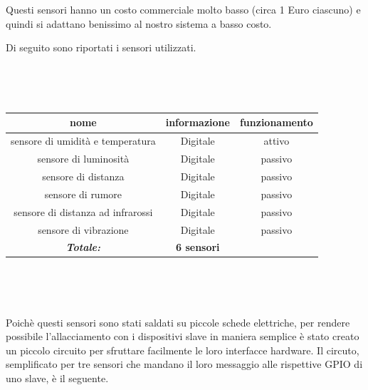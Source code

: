 \documentclass[a4paper,titlepage]{book}
\begin{document}
Questi sensori hanno un costo commerciale molto basso (circa 1 Euro ciascuno) e quindi si adattano benissimo al nostro sistema a basso costo.


Di seguito sono riportati i sensori utilizzati.

~

~


\begin{tabular}{|c  c  c|}
\hline
\multicolumn{1}{|c|}{\textbf {nome}} & \multicolumn{1}{|c|}{\textbf {informazione}} & \multicolumn{1}{c|}{\textbf {funzionamento}} \\
\hline

sensore di umidità e temperatura & Digitale	& attivo  \\
sensore di luminosità		& Digitale	& passivo \\
sensore di distanza		& Digitale	& passivo \\
sensore di rumore		& Digitale	& passivo \\
sensore di distanza ad infrarossi & Digitale	& passivo \\
sensore di vibrazione		& Digitale	& passivo \\

\hline

\textit{\textbf{Totale:}}	& \textbf{6 sensori} & \\

\hline
\end{tabular}

~

~

Poichè questi sensori sono stati saldati su piccole schede elettriche, per rendere possibile l'allacciamento con i dispositivi slave in maniera semplice è stato creato un piccolo circuito per sfruttare facilmente le loro interfacce hardware.
Il circuto, semplificato per tre sensori che mandano il loro messaggio alle rispettive GPIO di uno slave, è il seguente.

~

~
\end{document}
